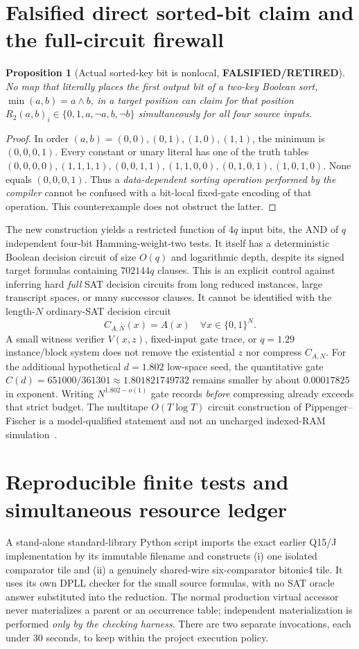 \documentclass[11pt]{article}
\newtheorem{proposition}[theorem]{Proposition}
\begin{document}
\section{Falsified direct sorted-bit claim and the full-circuit firewall}
\begin{proposition}[Actual sorted-key bit is nonlocal, \textbf{FALSIFIED/RETIRED}]
No map that literally places the first output bit of a two-key Boolean sort, $\min(a,b)=a\wedge b$, in a target position can claim for that position $R_{2}(a,b)_i\in\{0,1,a,\neg a,b,\neg b\}$ simultaneously for all four source inputs.
\end{proposition}
\begin{proof}
In order $(a,b)=(0,0),(0,1),(1,0),(1,1)$, the minimum is $(0,0,0,1)$. Every constant or unary literal has one of the truth tables $(0,0,0,0),(1,1,1,1),(0,0,1,1),(1,1,0,0),(0,1,0,1),(1,0,1,0)$. None equals $(0,0,0,1)$. Thus a \emph{data-dependent sorting operation performed by the compiler} cannot be confused with a bit-local fixed-gate encoding of that operation. This counterexample does not obstruct the latter.
\end{proof}

The new construction yields a restricted function of $4q$ input bits, the AND of $q$ independent four-bit Hamming-weight-two tests. It itself has a deterministic Boolean decision circuit of size $O(q)$ and logarithmic depth, despite its signed target formulas containing $702144q$ clauses. This is an explicit control against inferring hard \emph{full} SAT decision circuits from long reduced instances, large transcript spaces, or many successor clauses. It cannot be identified with the length-$N$ ordinary-SAT decision circuit
\[
C_{A,N}(x)=A(x)\quad\forall x\in\{0,1\}^N.
\]
A small witness verifier $V(x,z)$, fixed-input gate trace, or $q=1.29$ instance/block system does not remove the existential $z$ nor compress $C_{A,N}$. For the additional hypothetical $d=1.802$ low-space seed, the quantitative gate $C(d)=651000/361301\approx1.801821749732$ remains smaller by about $0.00017825$ in exponent. Writing $N^{1.802-o(1)}$ gate records \emph{before} compressing already exceeds that strict budget. The multitape $O(T\log T)$ circuit construction of Pippenger--Fischer is a model-qualified statement and not an uncharged indexed-RAM simulation~\cite{pippenger1979}.

\section{Reproducible finite tests and simultaneous resource ledger}
A stand-alone standard-library Python script imports the exact earlier Q15/J implementation by its immutable filename and constructs (i) one isolated comparator tile and (ii) a genuinely shared-wire six-comparator bitonic4 tile. It uses its own DPLL checker for the small source formulas, with no SAT oracle answer substituted into the reduction. The normal production virtual accessor never materializes a parent or an occurrence table; independent materialization is performed \emph{only by the checking harness}. There are two separate invocations, each under 30 seconds, to keep within the project execution policy.
\end{document}
